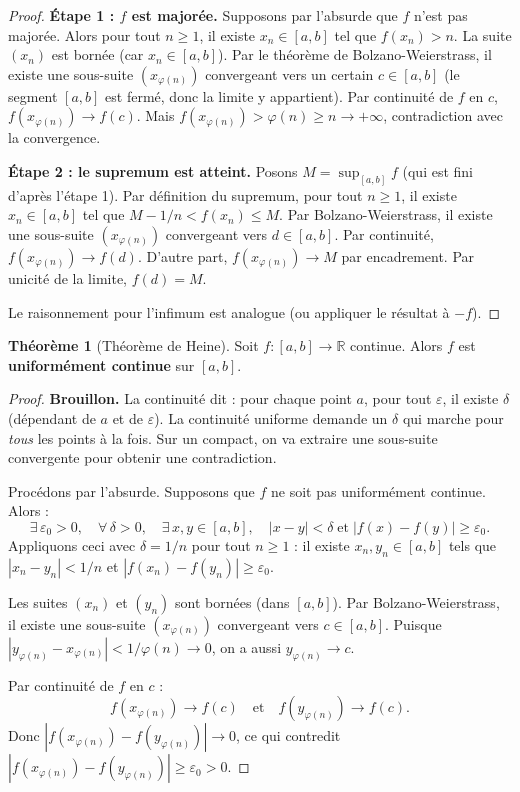 \documentclass[12pt,a4paper,openany]{book}
\theoremstyle{definition}
\newtheorem{theoreme}{Théorème}[chapter]
\newcommand{\R}{\mathbb{R}}
\begin{document}
\begin{proof}
\textbf{Étape 1 : $f$ est majorée.} Supposons par l'absurde que $f$ n'est pas majorée. Alors pour tout $n \geqslant 1$, il existe $x_n \in [a, b]$ tel que $f(x_n) > n$. La suite $(x_n)$ est bornée (car $x_n \in [a, b]$). Par le théorème de Bolzano-Weierstrass, il existe une sous-suite $(x_{\varphi(n)})$ convergeant vers un certain $c \in [a, b]$ (le segment $[a, b]$ est fermé, donc la limite y appartient). Par continuité de $f$ en $c$, $f(x_{\varphi(n)}) \to f(c)$. Mais $f(x_{\varphi(n)}) > \varphi(n) \geqslant n \to +\infty$, contradiction avec la convergence.

\textbf{Étape 2 : le supremum est atteint.} Posons $M = \sup_{[a,b]} f$ (qui est fini d'après l'étape 1). Par définition du supremum, pour tout $n \geqslant 1$, il existe $x_n \in [a, b]$ tel que $M - 1/n < f(x_n) \leqslant M$. Par Bolzano-Weierstrass, il existe une sous-suite $(x_{\varphi(n)})$ convergeant vers $d \in [a, b]$. Par continuité, $f(x_{\varphi(n)}) \to f(d)$. D'autre part, $f(x_{\varphi(n)}) \to M$ par encadrement. Par unicité de la limite, $f(d) = M$.

Le raisonnement pour l'infimum est analogue (ou appliquer le résultat à $-f$).
\end{proof}

\begin{theoreme}[Théorème de Heine]\label{thm:heine-unif}
Soit $f \colon [a, b] \to \R$ continue. Alors $f$ est \textbf{uniformément continue} sur $[a, b]$.
\end{theoreme}

\begin{proof}
\textbf{Brouillon.} La continuité dit : pour chaque point $a$, pour tout $\varepsilon$, il existe $\delta$ (dépendant de $a$ et de $\varepsilon$). La continuité uniforme demande un $\delta$ qui marche pour \emph{tous} les points à la fois. Sur un compact, on va extraire une sous-suite convergente pour obtenir une contradiction.

\medskip
Procédons par l'absurde. Supposons que $f$ ne soit pas uniformément continue. Alors :
\[
  \exists\, \varepsilon_0 > 0,\quad \forall\, \delta > 0,\quad
  \exists\, x, y \in [a, b],\quad |x - y| < \delta \;\text{et}\; |f(x) - f(y)| \geqslant \varepsilon_0.
\]
Appliquons ceci avec $\delta = 1/n$ pour tout $n \geqslant 1$ : il existe $x_n, y_n \in [a, b]$ tels que $|x_n - y_n| < 1/n$ et $|f(x_n) - f(y_n)| \geqslant \varepsilon_0$.

Les suites $(x_n)$ et $(y_n)$ sont bornées (dans $[a, b]$). Par Bolzano-Weierstrass, il existe une sous-suite $(x_{\varphi(n)})$ convergeant vers $c \in [a, b]$. Puisque $|y_{\varphi(n)} - x_{\varphi(n)}| < 1/\varphi(n) \to 0$, on a aussi $y_{\varphi(n)} \to c$.

Par continuité de $f$ en $c$ :
\[
  f(x_{\varphi(n)}) \to f(c) \quad\text{et}\quad f(y_{\varphi(n)}) \to f(c).
\]
Donc $|f(x_{\varphi(n)}) - f(y_{\varphi(n)})| \to 0$, ce qui contredit $|f(x_{\varphi(n)}) - f(y_{\varphi(n)})| \geqslant \varepsilon_0 > 0$.
\end{proof}
\end{document}
